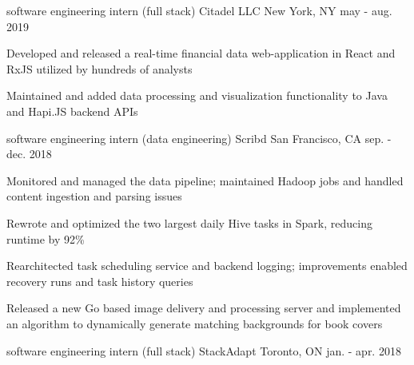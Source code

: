 
\begin{cventries}
  \cventry
    {software engineering intern (full stack)} %
    {Citadel LLC} %
    {New York, NY} %
    {may - aug. 2019} %
    {
      \begin{cvitems} %
        \vspace{1.0mm}
        \item {Developed and released a real-time financial data web-application in React and RxJS utilized by hundreds of analysts}
        \vspace{1.0mm}
        \item {Maintained and added data processing and visualization functionality to Java and Hapi.JS backend APIs}
      \end{cvitems}
    }
  \vspace{2.4mm}    
  \cventry
    {software engineering intern (data engineering)} %
    {Scribd} %
    {San Francisco, CA} %
    {sep. - dec. 2018} %
    {
      \begin{cvitems} %
        \vspace{1.0mm}
        \item {Monitored and managed the data pipeline; maintained Hadoop jobs and handled content ingestion and parsing issues}
        \vspace{1.0mm}
        \item {Rewrote and optimized the two largest daily Hive tasks in Spark, reducing runtime by 92\%}
        \vspace{1.0mm}
        \item {Rearchitected task scheduling service and backend logging; improvements enabled recovery runs and task history queries}
        \vspace{1.0mm}
        \item {Released a new Go based image delivery and processing server and implemented an algorithm to dynamically generate matching backgrounds for book covers}
      \end{cvitems}
    }
  \vspace{2.4mm}    
  \cventry
    {software engineering intern (full stack)} %
    {StackAdapt} %
    {Toronto, ON} %
    {jan. - apr. 2018} %
    {
      \begin{cvitems} %

\end{cvitems}}
\end{cventries}
